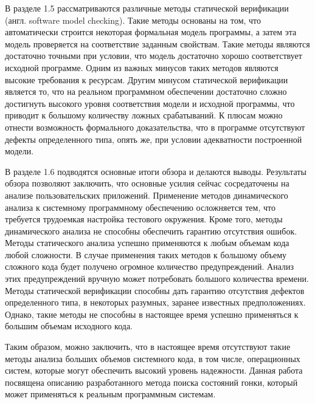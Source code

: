 В разделе 1.5 рассматриваются различные методы статической верификации (англ. software model checking).
Такие методы основаны на том, что автоматически строится некоторая формальная модель программы, а затем эта модель проверяется на соответствие заданным свойствам.
Такие методы являются достаточно точными при условии, что модель достаточно хорошо соответствует исходной программе.
Одним из важных минусов таких методов являются высокие требования к ресурсам.
Другим минусом статической верификации является то, что на реальном программном обеспечении достаточно сложно достигнуть высокого уровня соответствия модели и исходной программы, что приводит к большому количеству ложных срабатываний.
К плюсам можно отнести возможность формального доказательства, что в программе отсутствуют дефекты определенного типа, опять же, при условии адекватности построенной модели.

В разделе 1.6 подводятся основные итоги обзора и делаются выводы.
Результаты обзора позволяют заключить, что основные усилия сейчас сосредаточены на анализе пользовательских приложений.
Применение методов динамического анализа к системному программному обеспечению осложняется тем, что требуется трудоемкая настройка тестового окружения.
Кроме того, методы динамического анализа не способны обеспечить гарантию отсутствия ошибок.
Методы статического анализа успешно применяются к любым объемам кода любой сложности. 
В случае применения таких методов к большому объему сложного кода будет получено огромное количество предупреждений.
Анализ этих предупреждений вручную может потребовать большого количества времени.
Методы статической верификации способны дать гарантию отсутствия дефектов определенного типа, в некоторых разумных, заранее известных предположениях.
Однако, такие методы не способны в настоящее время успешно применяться к большим объемам исходного кода.

Таким образом, можно заключить, что в настоящее время отсутствуют такие методы анализа больших объемов системного кода, в том числе, операционных систем, которые могут обеспечить высокий уровень надежности.
Данная работа посвящена описанию разработанного метода поиска состояний гонки, который может применяться к реальным программным системам.

